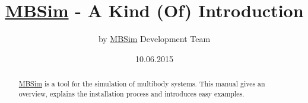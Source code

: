 \documentclass[fontsize=11pt,DIV=default]{scrartcl}
\newcommand{\MBSim}{\href{https://github.com/mbsim-env/mbsim/}{\textsf{MBSim}}}
\begin{document}
\title{\MBSim{} - A Kind (Of) Introduction}
\author{by \MBSim{} Development Team}
\date{10.06.2015}
\maketitle

\begin{abstract}
\MBSim{} is a tool for the simulation of multibody systems. This manual gives an overview, explains the installation process and introduces easy examples.
\end{abstract}

\cleardoublepage

\tableofcontents






\appendix




\end{document}
